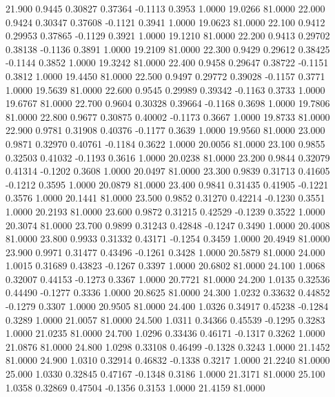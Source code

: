   21.900   0.9445   0.30827   0.37364  -0.1113   0.3953   1.0000  19.0266  81.0000
  22.000   0.9424   0.30347   0.37608  -0.1121   0.3941   1.0000  19.0623  81.0000
  22.100   0.9412   0.29953   0.37865  -0.1129   0.3921   1.0000  19.1210  81.0000
  22.200   0.9413   0.29702   0.38138  -0.1136   0.3891   1.0000  19.2109  81.0000
  22.300   0.9429   0.29612   0.38425  -0.1144   0.3852   1.0000  19.3242  81.0000
  22.400   0.9458   0.29647   0.38722  -0.1151   0.3812   1.0000  19.4450  81.0000
  22.500   0.9497   0.29772   0.39028  -0.1157   0.3771   1.0000  19.5639  81.0000
  22.600   0.9545   0.29989   0.39342  -0.1163   0.3733   1.0000  19.6767  81.0000
  22.700   0.9604   0.30328   0.39664  -0.1168   0.3698   1.0000  19.7806  81.0000
  22.800   0.9677   0.30875   0.40002  -0.1173   0.3667   1.0000  19.8733  81.0000
  22.900   0.9781   0.31908   0.40376  -0.1177   0.3639   1.0000  19.9560  81.0000
  23.000   0.9871   0.32970   0.40761  -0.1184   0.3622   1.0000  20.0056  81.0000
  23.100   0.9855   0.32503   0.41032  -0.1193   0.3616   1.0000  20.0238  81.0000
  23.200   0.9844   0.32079   0.41314  -0.1202   0.3608   1.0000  20.0497  81.0000
  23.300   0.9839   0.31713   0.41605  -0.1212   0.3595   1.0000  20.0879  81.0000
  23.400   0.9841   0.31435   0.41905  -0.1221   0.3576   1.0000  20.1441  81.0000
  23.500   0.9852   0.31270   0.42214  -0.1230   0.3551   1.0000  20.2193  81.0000
  23.600   0.9872   0.31215   0.42529  -0.1239   0.3522   1.0000  20.3074  81.0000
  23.700   0.9899   0.31243   0.42848  -0.1247   0.3490   1.0000  20.4008  81.0000
  23.800   0.9933   0.31332   0.43171  -0.1254   0.3459   1.0000  20.4949  81.0000
  23.900   0.9971   0.31477   0.43496  -0.1261   0.3428   1.0000  20.5879  81.0000
  24.000   1.0015   0.31689   0.43823  -0.1267   0.3397   1.0000  20.6802  81.0000
  24.100   1.0068   0.32007   0.44153  -0.1273   0.3367   1.0000  20.7721  81.0000
  24.200   1.0135   0.32536   0.44490  -0.1277   0.3336   1.0000  20.8625  81.0000
  24.300   1.0232   0.33632   0.44852  -0.1279   0.3307   1.0000  20.9505  81.0000
  24.400   1.0326   0.34917   0.45238  -0.1284   0.3289   1.0000  21.0057  81.0000
  24.500   1.0311   0.34366   0.45539  -0.1295   0.3283   1.0000  21.0235  81.0000
  24.700   1.0296   0.33436   0.46171  -0.1317   0.3262   1.0000  21.0876  81.0000
  24.800   1.0298   0.33108   0.46499  -0.1328   0.3243   1.0000  21.1452  81.0000
  24.900   1.0310   0.32914   0.46832  -0.1338   0.3217   1.0000  21.2240  81.0000
  25.000   1.0330   0.32845   0.47167  -0.1348   0.3186   1.0000  21.3171  81.0000
  25.100   1.0358   0.32869   0.47504  -0.1356   0.3153   1.0000  21.4159  81.0000
